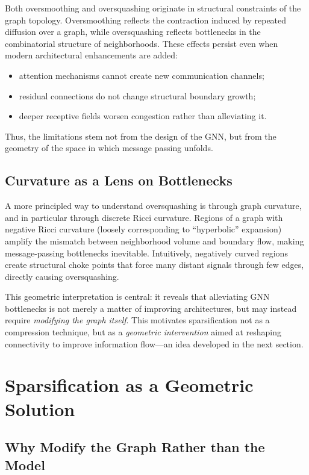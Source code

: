 \documentclass[letterpaper,12pt]{article}
\begin{document}
Both oversmoothing and oversquashing originate in structural constraints of the graph topology. Oversmoothing reflects the contraction induced by repeated diffusion over a graph, while oversquashing reflects bottlenecks in the combinatorial structure of neighborhoods. These effects persist even when modern architectural enhancements are added:
\begin{itemize}
    \item attention mechanisms cannot create new communication channels;
    \item residual connections do not change structural boundary growth;
    \item deeper receptive fields worsen congestion rather than alleviating it.
\end{itemize}
Thus, the limitations stem not from the design of the GNN, but from the geometry of the space in which message passing unfolds.

\subsection{Curvature as a Lens on Bottlenecks}

A more principled way to understand oversquashing is through graph curvature, and in particular through discrete Ricci curvature. Regions of a graph with negative Ricci curvature (loosely corresponding to “hyperbolic” expansion) amplify the mismatch between neighborhood volume and boundary flow, making message-passing bottlenecks inevitable. Intuitively, negatively curved regions create structural choke points that force many distant signals through few edges, directly causing oversquashing.

This geometric interpretation is central: it reveals that alleviating GNN bottlenecks is not merely a matter of improving architectures, but may instead require \textit{modifying the graph itself}. This motivates sparsification not as a compression technique, but as a \emph{geometric intervention} aimed at reshaping connectivity to improve information flow—an idea developed in the next section.

\section{Sparsification as a Geometric Solution}

\subsection{Why Modify the Graph Rather than the Model}
\end{document}
